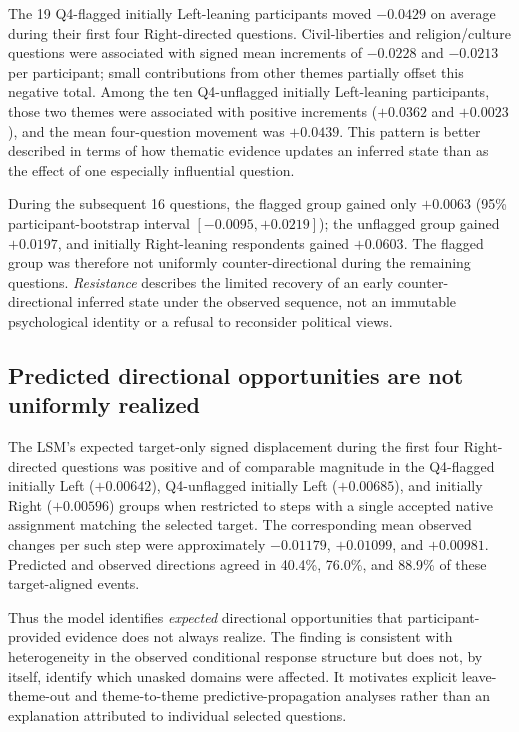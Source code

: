 \documentclass[11pt]{article}
\begin{document}


The 19 Q4-flagged initially Left-leaning participants moved $-0.0429$ on average during their first four Right-directed questions. Civil-liberties and religion/culture questions were associated with signed mean increments of $-0.0228$ and $-0.0213$ per participant; small contributions from other themes partially offset this negative total. Among the ten Q4-unflagged initially Left-leaning participants, those two themes were associated with positive increments ($+0.0362$ and $+0.0023$), and the mean four-question movement was $+0.0439$. This pattern is better described in terms of how thematic evidence updates an inferred state than as the effect of one especially influential question.

During the subsequent 16 questions, the flagged group gained only $+0.0063$ (95\% participant-bootstrap interval $[-0.0095,+0.0219]$); the unflagged group gained $+0.0197$, and initially Right-leaning respondents gained $+0.0603$. The flagged group was therefore not uniformly counter-directional during the remaining questions. \emph{Resistance} describes the limited recovery of an early counter-directional inferred state under the observed sequence, not an immutable psychological identity or a refusal to reconsider political views.

\subsection*{Predicted directional opportunities are not uniformly realized}
The LSM's expected target-only signed displacement during the first four Right-directed questions was positive and of comparable magnitude in the Q4-flagged initially Left ($+0.00642$), Q4-unflagged initially Left ($+0.00685$), and initially Right ($+0.00596$) groups when restricted to steps with a single accepted native assignment matching the selected target. The corresponding mean observed changes per such step were approximately $-0.01179$, $+0.01099$, and $+0.00981$. Predicted and observed directions agreed in 40.4\%, 76.0\%, and 88.9\% of these target-aligned events.

Thus the model identifies \emph{expected} directional opportunities that participant-provided evidence does not always realize. The finding is consistent with heterogeneity in the observed conditional response structure but does not, by itself, identify which unasked domains were affected. It motivates explicit leave-theme-out and theme-to-theme predictive-propagation analyses rather than an explanation attributed to individual selected questions.
\end{document}
